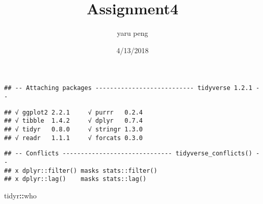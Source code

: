 \documentclass[]{article}
\title{Assignment4}
\author{yaru peng}
\date{4/13/2018}
\newenvironment{Shaded}{\begin{snugshade}}{\end{snugshade}}
\newcommand{\KeywordTok}[1]{\textcolor[rgb]{0.13,0.29,0.53}{\textbf{#1}}}
\newcommand{\OperatorTok}[1]{\textcolor[rgb]{0.81,0.36,0.00}{\textbf{#1}}}
\newcommand{\NormalTok}[1]{#1}
\begin{document}
\maketitle

\begin{Shaded}
\end{Shaded}

\begin{verbatim}
## -- Attaching packages --------------------------- tidyverse 1.2.1 --
\end{verbatim}

\begin{verbatim}
## √ ggplot2 2.2.1     √ purrr   0.2.4
## √ tibble  1.4.2     √ dplyr   0.7.4
## √ tidyr   0.8.0     √ stringr 1.3.0
## √ readr   1.1.1     √ forcats 0.3.0
\end{verbatim}

\begin{verbatim}
## -- Conflicts ------------------------------ tidyverse_conflicts() --
## x dplyr::filter() masks stats::filter()
## x dplyr::lag()    masks stats::lag()
\end{verbatim}

\begin{Shaded}
\begin{Highlighting}[]
\NormalTok{tidyr}\OperatorTok{::}\NormalTok{who}
\end{Highlighting}
\end{Shaded}
\end{document}

